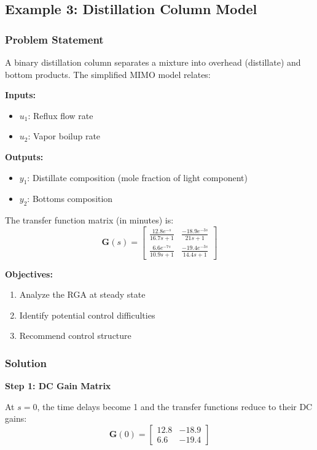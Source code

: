 \subsection{Example 3: Distillation Column Model}

\subsubsection{Problem Statement}

A binary distillation column separates a mixture into overhead (distillate) and bottom products. The simplified MIMO model relates:

\textbf{Inputs:}
\begin{itemize}
\item $u_1$: Reflux flow rate
\item $u_2$: Vapor boilup rate
\end{itemize}

\textbf{Outputs:}
\begin{itemize}
\item $y_1$: Distillate composition (mole fraction of light component)
\item $y_2$: Bottoms composition
\end{itemize}

The transfer function matrix (in minutes) is:
\begin{equation}
\mathbf{G}(s) = \begin{bmatrix} \frac{12.8e^{-s}}{16.7s+1} & \frac{-18.9e^{-3s}}{21s+1} \\[6pt] \frac{6.6e^{-7s}}{10.9s+1} & \frac{-19.4e^{-3s}}{14.4s+1} \end{bmatrix}
\end{equation}

\textbf{Objectives:}
\begin{enumerate}
\item Analyze the RGA at steady state
\item Identify potential control difficulties
\item Recommend control structure
\end{enumerate}

\subsubsection{Solution}

\textbf{Step 1: DC Gain Matrix}

At $s = 0$, the time delays become 1 and the transfer functions reduce to their DC gains:
\begin{equation}
\mathbf{G}(0) = \begin{bmatrix} 12.8 & -18.9 \\ 6.6 & -19.4 \end{bmatrix}
\end{equation}

